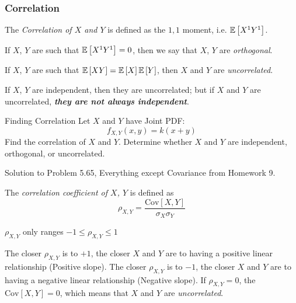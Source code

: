 \subsubsection{Correlation}\label{subsubsec:Correlation}
\begin{definition}[Correlation]\label{def:Correlation}
  The \emph{Correlation of $X$ and $Y$} is defined as the $1,1$ moment, i.e. $\operatorname{\operatorname{\mathbb{E}}} \left[ X^{1} Y^{1} \right]$.
  \begin{remark}
    If $X$, $Y$ are such that $\operatorname{\operatorname{\mathbb{E}}} \left[ X^{1} Y^{1} \right] = 0$, then we say that $X$, $Y$ are \emph{orthogonal}.
  \end{remark}
  \begin{remark}[Uncorrelated]\label{rmk:Uncorrelated}
    If $X$, $Y$ are such that $\operatorname{\operatorname{\mathbb{E}}} \left[ XY \right] = \operatorname{\operatorname{\mathbb{E}}} \left[ X \right] \operatorname{\operatorname{\mathbb{E}}} \left[ Y \right]$, then $X$ and $Y$ are \emph{uncorrelated}.
  \end{remark}
  \begin{remark}
    If $X$, $Y$ are independent, then they are uncorrelated; but if $X$ and $Y$ are uncorrelated, \emph{\textbf{they are not always independent}}.
  \end{remark}
\end{definition}
\begin{example}[Problem 5.65]{Finding Correlation}
  Let $X$ and $Y$ have Joint PDF:
  \begin{equation*}
    f_{X,Y} \left( x,y \right) = k \left( x+y \right)
  \end{equation*}
  Find the correlation of $X$ and $Y$.
  Determine whether $X$ and $Y$ are independent, orthogonal, or uncorrelated.

  \tcblower

  Solution to Problem 5.65, Everything except Covariance from Homework 9.
\end{example}
\begin{definition}\label{def:Correlation Coefficient}
  The \emph{correlation coefficient of $X$, $Y$} is defined as
  \begin{equation}\label{eq:Correlation Coefficient}
    \rho_{X,Y} = \frac{\text{Cov} \left[ X,Y \right]}{\sigma_{X} \sigma_{Y}}
  \end{equation}
  \begin{remark}
    $\rho_{X,Y}$ only ranges $-1 \leq \rho_{X,Y} \leq 1$
  \end{remark}
  \begin{remark}
    The closer $\rho_{X,Y}$ is to $+1$, the closer $X$ and $Y$ are to having a positive linear relationship (Positive slope). \newline
    The closer $\rho_{X,Y}$ is to $-1$, the closer $X$ and $Y$ are to having a negative linear relationship (Negative slope). \newline
    If $\rho_{X,Y} = 0$, the $\text{Cov}\left[ X,Y \right] = 0$, which means that $X$ and $Y$ are \emph{uncorrelated}.
  \end{remark}
\end{definition}


